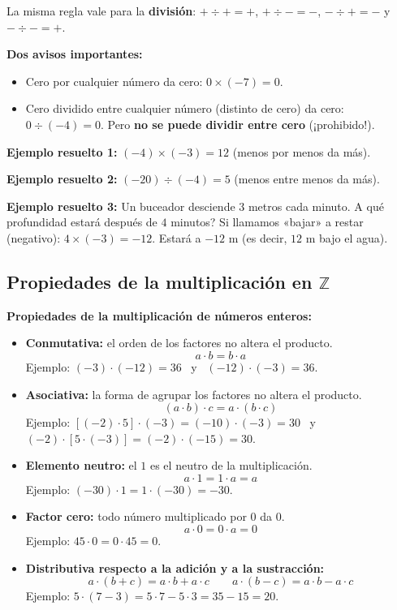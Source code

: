 \documentclass[12pt, letterpaper]{article}
\newcommand{\Z}{\mathbb{Z}}
\begin{document}
\noindent La misma regla vale para la \textbf{división}: $+ \div + = +$, $+ \div - = -$, $- \div + = -$ y $- \div - = +$.

\begin{cuadroadvertencia}
  \textbf{Dos avisos importantes:}
  \begin{itemize}
    \item Cero por cualquier número da cero: $0 \times (-7) = 0$.
    \item Cero dividido entre cualquier número (distinto de cero) da cero: $0 \div (-4) = 0$. Pero \textbf{no se puede dividir entre cero} (¡prohibido!).
  \end{itemize}
\end{cuadroadvertencia}

\noindent\textbf{Ejemplo resuelto 1:} $(-4) \times (-3) = 12$ (menos por menos da más).

\noindent\textbf{Ejemplo resuelto 2:} $(-20) \div (-4) = 5$ (menos entre menos da más).

\noindent\textbf{Ejemplo resuelto 3:} Un buceador desciende $3$ metros cada minuto. \textquestiondown A qué profundidad estará después de $4$ minutos? Si llamamos «bajar» a restar (negativo): $4 \times (-3) = -12$. Estará a $-12$ m (es decir, $12$ m bajo el agua).

\subsection{Propiedades de la multiplicación en $\Z$}

\begin{cuadroteoria}
  \textbf{Propiedades de la multiplicación de números enteros:}
  \begin{itemize}
    \item \textbf{Conmutativa:} el orden de los factores no altera el producto.
          \[
            a \cdot b = b \cdot a
          \]
          Ejemplo: $(-3) \cdot (-12) = 36$ \ y \ $(-12) \cdot (-3) = 36$.
    \item \textbf{Asociativa:} la forma de agrupar los factores no altera el producto.
          \[
            (a \cdot b) \cdot c = a \cdot (b \cdot c)
          \]
          Ejemplo: $[(-2) \cdot 5] \cdot (-3) = (-10) \cdot (-3) = 30$ \ y \
          $(-2) \cdot [5 \cdot (-3)] = (-2) \cdot (-15) = 30$.
    \item \textbf{Elemento neutro:} el $1$ es el neutro de la multiplicación.
          \[
            a \cdot 1 = 1 \cdot a = a
          \]
          Ejemplo: $(-30) \cdot 1 = 1 \cdot (-30) = -30$.
    \item \textbf{Factor cero:} todo número multiplicado por $0$ da $0$.
          \[
            a \cdot 0 = 0 \cdot a = 0
          \]
          Ejemplo: $45 \cdot 0 = 0 \cdot 45 = 0$.
    \item \textbf{Distributiva respecto a la adición y a la sustracción:}
          \[
            a \cdot (b + c) = a \cdot b + a \cdot c
            \qquad
            a \cdot (b - c) = a \cdot b - a \cdot c
          \]
          Ejemplo: $5 \cdot (7 - 3) = 5 \cdot 7 - 5 \cdot 3 = 35 - 15 = 20$.
  \end{itemize}
\end{cuadroteoria}
\end{document}
